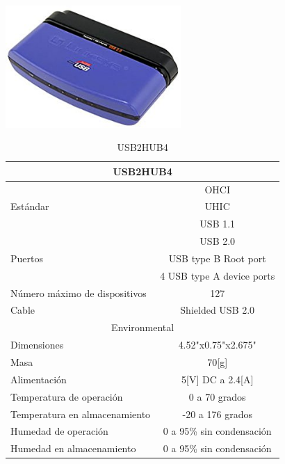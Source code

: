 \documentclass[a4paper]{book}
\begin{document}
\begin{center}
\includegraphics[width=0.5\textwidth]{Figures/Hardware/Partes/Cisco-Linksys.png}
\label{fig:Hardware:Partes:Cisco}
\end{center}

\begin{table}[H]
\begin{center}
\begin{tabular}{|l|l|}%


\hline
\multicolumn{2}{|c|}{USB2HUB4} \\ \hline %
\multirow{3}{1cm}{Estándar} & \multicolumn{1}{|c|}{OHCI}\\ & \multicolumn{1}{|c|}{UHIC}\\ & \multicolumn{1}{|c|}{USB 1.1}\\ & \multicolumn{1}{|c|}{USB 2.0}\\ \hline
Puertos & \multicolumn{1}{|c|}{USB type B Root port}\\ &\multicolumn{1}{|c|}{4 USB type A device ports}\\ \hline
Número máximo de dispositivos & \multicolumn{1}{|c|}{127}\\ \hline
Cable & \multicolumn{1}{|c|}{Shielded USB 2.0}\\ \hline
\multicolumn{2}{|c|}{Environmental}\\ \hline
Dimensiones & \multicolumn{1}{|c|}{4.52"x0.75"x2.675"}\\ \hline
Masa & \multicolumn{1}{|c|}{70[g]}\\ \hline
Alimentación & \multicolumn{1}{|c|}{5[V] DC a 2.4[A]}\\ \hline
Temperatura de operación & \multicolumn{1}{|c|}{0 a 70 grados}\\ \hline
Temperatura en almacenamiento & \multicolumn{1}{|c|}{-20 a 176 grados}\\ \hline
Humedad de operación & \multicolumn{1}{|c|}{0 a 95\% sin condensación}\\ \hline
Humedad en almacenamiento & \multicolumn{1}{|c|}{0 a 95\% sin condensación}\\ \hline

\end{tabular}
\caption{USB2HUB4}
\label{Datos del USB2HUB4}
\end{center}
\end{table}
\end{document}
